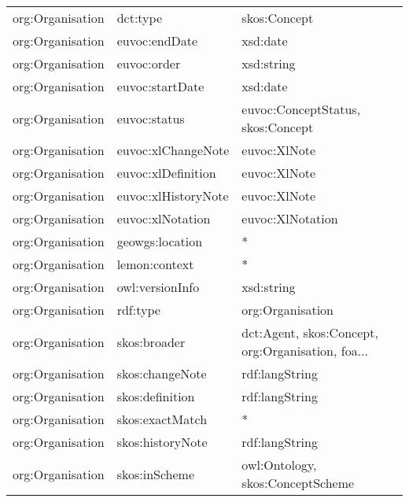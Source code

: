 \documentclass[10pt,a4paper,titlepage,final]{article}
\begin{document}
\begin{longtable}{lll}
    org:Organisation &                dct:type &                                       skos:Concept \\
    org:Organisation &           euvoc:endDate &                                           xsd:date \\
    org:Organisation &             euvoc:order &                                         xsd:string \\
    org:Organisation &         euvoc:startDate &                                           xsd:date \\
    org:Organisation &            euvoc:status &                  euvoc:ConceptStatus, skos:Concept \\
    org:Organisation &      euvoc:xlChangeNote &                                       euvoc:XlNote \\
    org:Organisation &      euvoc:xlDefinition &                                       euvoc:XlNote \\
    org:Organisation &     euvoc:xlHistoryNote &                                       euvoc:XlNote \\
    org:Organisation &        euvoc:xlNotation &                                   euvoc:XlNotation \\
    org:Organisation &         geowgs:location &                                                  * \\
    org:Organisation &           lemon:context &                                                  * \\
    org:Organisation &         owl:versionInfo &                                         xsd:string \\
    org:Organisation &                rdf:type &                                   org:Organisation \\
    org:Organisation &            skos:broader &  dct:Agent, skos:Concept, org:Organisation, foa... \\
    org:Organisation &         skos:changeNote &                                     rdf:langString \\
    org:Organisation &         skos:definition &                                     rdf:langString \\
    org:Organisation &         skos:exactMatch &                                                  * \\
    org:Organisation &        skos:historyNote &                                     rdf:langString \\
    org:Organisation &           skos:inScheme &                   owl:Ontology, skos:ConceptScheme \\

\end{longtable}
\end{document}
